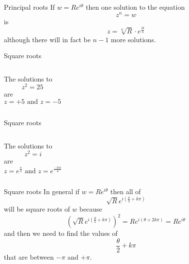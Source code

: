 \documentclass{beamer}
\begin{document}
\begin{frame}{Principal roots}
If $w = Re^{i\theta}$ then one solution to the equation
\begin{equation*}
z^n = w
\end{equation*}
is 
\begin{equation*}
z = \sqrt[n]{R}\cdot e^{\frac{i\theta}{n}}
\end{equation*}
although there will in fact be $n-1$ more solutions.
\end{frame}

\begin{frame}{Square roots}
\begin{columns}
The solutions to
\begin{equation*}
	z^2 = 25
\end{equation*}
are
\begin{equation*}
z=+5\text{ and } z=-5
\end{equation*}
\end{columns}
\end{frame}

\begin{frame}{Square roots}
\begin{columns}
The solutions to
\begin{equation*}
	z^2 = i
\end{equation*}
are
\begin{equation*}
z=e^{\frac{\pi}{4}}\text{ and } z=e^{\frac{-3\pi i}{4}}
\end{equation*}
\end{columns}
\end{frame}

\begin{frame}{Square roots}
In general if $w = Re^{i\theta}$ then all of
\begin{equation*}
\sqrt{R}e^{i\left(\frac{\theta}{2}+k\pi\right)}
\end{equation*}
will be square roots of $w$ because
\begin{equation*}
\left(\sqrt{R}e^{i\left(\frac{\theta}{2}+k\pi\right)}\right)^2 = Re^{i\left(\theta+2k\pi\right)} = Re^{i\theta}
\end{equation*}
and then we need to find the values of 
\begin{equation*}
\frac{\theta}{2}+k\pi
\end{equation*}
that are between $-\pi$ and $+\pi$.
\end{frame}
\end{document}
